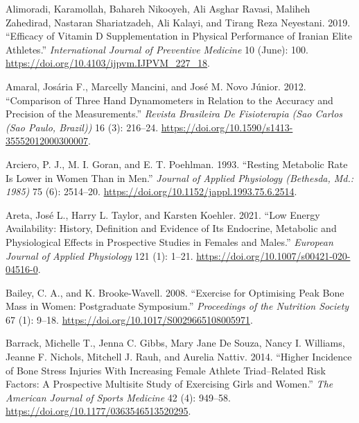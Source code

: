 \documentclass[
]{article}
\newlength{\cslhangindent}
\newenvironment{CSLReferences}[2] %
 {\begin{list}{}{%
  \setlength{\itemindent}{0pt}
  \setlength{\leftmargin}{0pt}
  \setlength{\parsep}{0pt}
  \ifodd #1
   \setlength{\leftmargin}{\cslhangindent}
   \setlength{\itemindent}{-1\cslhangindent}
  \fi
  \setlength{\itemsep}{#2\baselineskip}}}
 {\end{list}}
\begin{document}
\label{refs}
\begin{CSLReferences}{1}{0}
Alimoradi, Karamollah, Bahareh Nikooyeh, Ali Asghar Ravasi, Maliheh Zahedirad, Nastaran Shariatzadeh, Ali Kalayi, and Tirang Reza Neyestani. 2019. {``Efficacy of {Vitamin} {D} {Supplementation} in {Physical} {Performance} of {Iranian} {Elite} {Athletes}.''} \emph{International Journal of Preventive Medicine} 10 (June): 100. \url{https://doi.org/10.4103/ijpvm.IJPVM_227_18}.

Amaral, Josária F., Marcelly Mancini, and José M. Novo Júnior. 2012. {``Comparison of Three Hand Dynamometers in Relation to the Accuracy and Precision of the Measurements.''} \emph{Revista Brasileira De Fisioterapia (Sao Carlos (Sao Paulo, Brazil))} 16 (3): 216--24. \url{https://doi.org/10.1590/s1413-35552012000300007}.

Arciero, P. J., M. I. Goran, and E. T. Poehlman. 1993. {``Resting Metabolic Rate Is Lower in Women Than in Men.''} \emph{Journal of Applied Physiology (Bethesda, Md.: 1985)} 75 (6): 2514--20. \url{https://doi.org/10.1152/jappl.1993.75.6.2514}.

Areta, José L., Harry L. Taylor, and Karsten Koehler. 2021. {``Low Energy Availability: History, Definition and Evidence of Its Endocrine, Metabolic and Physiological Effects in Prospective Studies in Females and Males.''} \emph{European Journal of Applied Physiology} 121 (1): 1--21. \url{https://doi.org/10.1007/s00421-020-04516-0}.

Bailey, C. A., and K. Brooke-Wavell. 2008. {``Exercise for Optimising Peak Bone Mass in Women: {Postgraduate} {Symposium}.''} \emph{Proceedings of the Nutrition Society} 67 (1): 9--18. \url{https://doi.org/10.1017/S0029665108005971}.

Barrack, Michelle T., Jenna C. Gibbs, Mary Jane De Souza, Nancy I. Williams, Jeanne F. Nichols, Mitchell J. Rauh, and Aurelia Nattiv. 2014. {``Higher {Incidence} of {Bone} {Stress} {Injuries} {With} {Increasing} {Female} {Athlete} {Triad}--{Related} {Risk} {Factors}: {A} {Prospective} {Multisite} {Study} of {Exercising} {Girls} and {Women}.''} \emph{The American Journal of Sports Medicine} 42 (4): 949--58. \url{https://doi.org/10.1177/0363546513520295}.


\end{CSLReferences}
\end{document}
